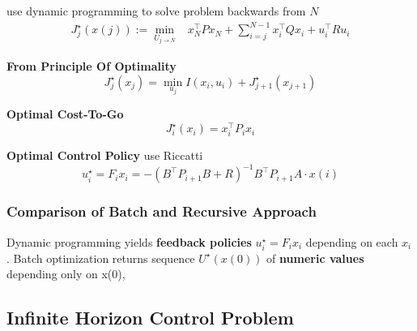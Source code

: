 use dynamic programming to solve problem backwards from $N$
%
\begin{align*}
	J_j^\star(x(j)) :=
	\min_{U_{j\to N}} & x_N^\top P x_N \!+
	\sum_{i=j}^{N-1}x_i^\top Q x_i + u_i^\top R u_i
\end{align*}
%
\begin{minipage}[t]{0.64\linewidth}
	\textbf{From Principle Of Optimality}
	\[
		J_j^\star(x_j) =
		\min_{u_j} I(x_i,u_i) + J_{j+1}^\star(x_{j+1})
	\]
\end{minipage}
\begin{minipage}[t]{0.32\linewidth}
	\textbf{Optimal Cost-To-Go}
	\[
		J_i^\star(x_i) = x_i^\top P_i x_i
	\]
\end{minipage}
%
\textbf{Optimal Control Policy}
use Riccatti
\[
	u_i^\star = F_i x_i =
	-(B^\top P_{i+1}B + R)^{-1}
	B^\top P_{i+1} A \cdot x(i)
\]


\subsubsection{Comparison of Batch and Recursive Approach}

Dynamic programming yields \textbf{feedback policies}
$u_i^\star = F_i x_i$ depending on each $x_i$.
Batch optimization returns sequence $U^\star(x(0))$
of \textbf{numeric values} depending only on x(0),

\subsection{Infinite Horizon Control Problem}

